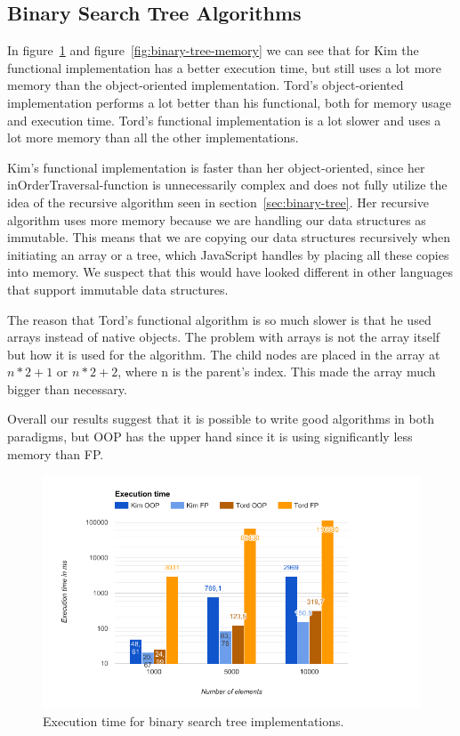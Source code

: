 \documentclass {article}
\begin{document}
\subsection{Binary Search Tree Algorithms}
In figure~\ref{fig:binary-tree-runtime} and figure~\ref{fig:binary-tree-memory} we can see that for Kim the functional implementation has a better execution time, but still uses a lot more memory than the object-oriented implementation. Tord's object-oriented implementation performs a lot better than his functional, both for memory usage and execution time. Tord's functional implementation is a lot slower and uses a lot more memory than all the other implementations.

Kim's functional implementation is faster than her object-oriented, since her inOrderTraversal-function is unnecessarily complex and does not fully utilize the idea of the recursive algorithm seen in section~\ref{sec:binary-tree}. Her recursive algorithm uses more memory because we are handling our data structures as immutable. This means that we are copying our data structures recursively when initiating an array or a tree, which JavaScript handles by placing all these copies into memory. We suspect that this would have looked different in other languages that support immutable data structures. 

The reason that Tord’s functional algorithm is so much slower is that he used arrays instead of native objects. The problem with arrays is not the array itself but how it is used for the algorithm. The child nodes are placed in the array at \(n * 2 + 1\) or \(n * 2 + 2\), where n is the parent's index. This made the array much bigger than necessary. 

Overall our results suggest that it is possible to write good algorithms in both paradigms, but OOP has the upper hand since it is using significantly less memory than FP.

\begin{figure}[H]
\centering
\includegraphics[width=\textwidth]{binary-tree-runtime}

\caption{Execution time for binary search tree implementations.}
\label{fig:binary-tree-runtime}
\end{figure}
\end{document}
